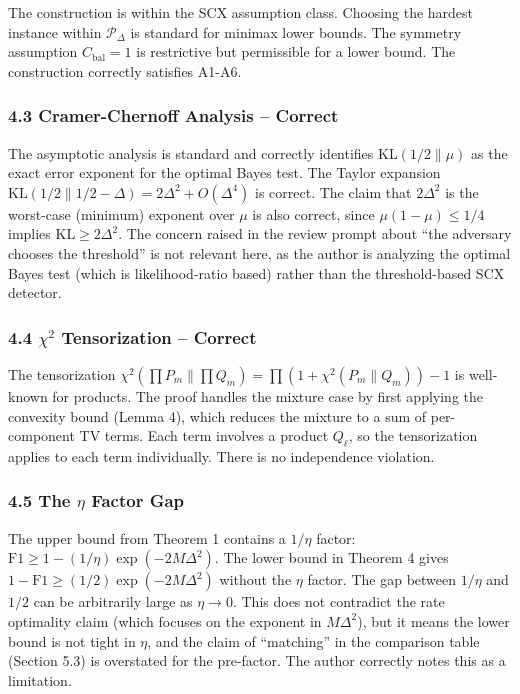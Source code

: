 \documentclass[
  12pt,
]{ctexart}
\begin{document}
The construction is within the SCX assumption class. Choosing the
hardest instance within \(\mathcal{P}_\Delta\) is standard for minimax
lower bounds. The symmetry assumption \(C_{\text{bal}}=1\) is
restrictive but permissible for a lower bound. The construction
correctly satisfies A1-A6.

\subsubsection{4.3 Cramer-Chernoff Analysis --
Correct}\label{cramer-chernoff-analysis-correct}

The asymptotic analysis is standard and correctly identifies
\(\text{KL}(1/2 \| \mu)\) as the exact error exponent for the optimal
Bayes test. The Taylor expansion
\(\text{KL}(1/2 \| 1/2-\Delta) = 2\Delta^2 + O(\Delta^4)\) is correct.
The claim that \(2\Delta^2\) is the worst-case (minimum) exponent over
\(\mu\) is also correct, since \(\mu(1-\mu) \leq 1/4\) implies
\(\text{KL} \geq 2\Delta^2\). The concern raised in the review prompt
about ``the adversary chooses the threshold'' is not relevant here, as
the author is analyzing the optimal Bayes test (which is
likelihood-ratio based) rather than the threshold-based SCX detector.

\subsubsection{\texorpdfstring{4.4 \(\chi^2\) Tensorization --
Correct}{4.4 \textbackslash chi\^{}2 Tensorization -- Correct}}\label{chi2-tensorization-correct}

The tensorization
\(\chi^2(\prod P_m \| \prod Q_m) = \prod(1+\chi^2(P_m\|Q_m))-1\) is
well-known for products. The proof handles the mixture case by first
applying the convexity bound (Lemma 4), which reduces the mixture to a
sum of per-component TV terms. Each term involves a product \(Q_\ell\),
so the tensorization applies to each term individually. There is no
independence violation.

\subsubsection{\texorpdfstring{4.5 The \(\eta\) Factor
Gap}{4.5 The \textbackslash eta Factor Gap}}\label{the-eta-factor-gap}

The upper bound from Theorem 1 contains a \(1/\eta\) factor:
\(\text{F1} \geq 1 - (1/\eta)\exp(-2M\Delta^2)\). The lower bound in
Theorem 4 gives \(1-\text{F1} \geq (1/2)\exp(-2M\Delta^2)\) without the
\(\eta\) factor. The gap between \(1/\eta\) and \(1/2\) can be
arbitrarily large as \(\eta \to 0\). This does not contradict the rate
optimality claim (which focuses on the exponent in \(M\Delta^2\)), but
it means the lower bound is not tight in \(\eta\), and the claim of
``matching'' in the comparison table (Section 5.3) is overstated for the
pre-factor. The author correctly notes this as a limitation.
\end{document}
